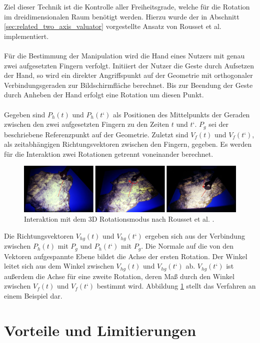 Ziel dieser Technik ist die Kontrolle aller Freiheitsgrade, welche für die Rotation im dreidimensionalen Raum benötigt werden. Hierzu wurde der in Abschnitt \ref{sec:related_two_axis_valuator} vorgestellte Ansatz von Rousset et al. \cite{rousset:2014} implementiert. 
\\\\
Für die Bestimmung der Manipulation wird die Hand eines Nutzers mit genau zwei aufgesetzten Fingern verfolgt. Initiiert der Nutzer die Geste durch Aufsetzen der Hand, so wird ein direkter Angriffspunkt auf der Geometrie mit orthogonaler Verbindungsgeraden zur Bildschirmfläche berechnet. Bis zur Beendung der Geste durch Anheben der Hand erfolgt eine Rotation um diesen Punkt.
\\\\
Gegeben sind $P_h(t)$ und $P_h(t‘)$ als Positionen des Mittelpunkts der Geraden zwischen den zwei aufgesetzten Fingern zu den Zeiten $t$ und $t‘$. $P_g$ sei der beschriebene Referenzpunkt auf der Geometrie. Zuletzt sind $V_f(t)$ und $V_f(t‘)$, als zeitabhängigen Richtungsvektoren zwischen den Fingern, gegeben. Es werden für die Interaktion zwei Rotationen getrennt voneinander berechnet.

\begin{figure}
	\begin{center}
		\includegraphics[width=12cm]{img/3d_rotation.pdf}
	\end{center}
	\caption{Interaktion mit dem 3D Rotationsmodus nach Rousset et al. \cite{rousset:2014}.}
	\label{fig:3d_rotation}
\end{figure}

Die Richtungsvektoren $V_{hg}(t)$ und $V_{hg}(t‘)$ ergeben sich aus der Verbindung zwischen $P_h(t)$ mit $P_g$ und $P_h(t‘)$ mit $P_g$. Die Normale auf die von den Vektoren aufgespannte Ebene bildet die Achse der ersten Rotation. Der Winkel leitet sich aus dem Winkel zwischen $V_{hg}(t)$ und $V_{hg}(t‘)$ ab. $V_{hg}(t‘)$ ist außerdem die Achse für eine zweite Rotation, deren Maß durch den Winkel zwischen $V_f(t)$ und $V_f(t‘)$ bestimmt wird. Abbildung \ref{fig:3d_rotation} stellt das Verfahren an einem Beispiel dar.


\section{Vorteile und Limitierungen}
\label{sec:vorteile_und_limitierungen_explizit}

